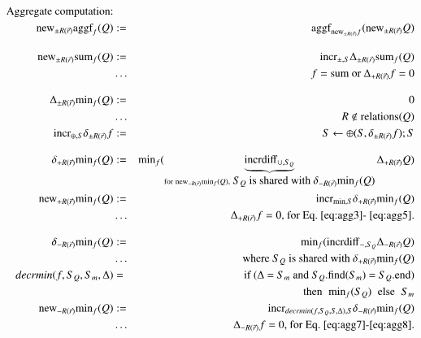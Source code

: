 \documentclass{article}
\begin{document}
%
%
%
\begin{figure*}
\begin{eqnarray}
\mbox{Aggregate computation:} && \nonumber
\\
\label{eq:agg1}
\algnew_{\pm R(\vec{r})} \algaggf_f(Q) &:=&
   \algaggf_{\algnew_{\pm R(\vec{r})} f}(\algnew_{\pm R(\vec{r})} Q)
%
%
\\[2ex]
\label{eq:agg2}
\algnew_{\pm R(\vec{r})} \algsum_{f}(Q) &:=&
\algincr_{\pm, S} \Delta_{\pm R(\vec{r})} \algsum_{f}(Q)
\\
\nonumber &\dots&
\mbox{$f = \algsum$ or $\Delta_{+R(\vec{r})} f = 0$}
%
%
\\[2ex]
\label{eq:agg3}
\Delta_{\pm R(\vec{r})} \algmin_f(Q) &:=& 0
\\
\nonumber &\dots& R \notin \mbox{relations($Q$)}
%
%
\\
\label{eq:agg4}
\algincr_{\oplus, S} \delta_{\pm R(\vec{r})} f &:=&
S \leftarrow \oplus(S, \delta_{\pm R(\vec{r})} f); S
%
%
\\[2ex]
\label{eq:agg5}
\delta_{+R(\vec{r})} \algmin_f(Q) &:=& \algmin_{f} (
    \underbrace{\algincrdiff_{\cup, S_Q}}_{
        \mathrm{for} \; \algnew_{-R(\vec{r})} \algmin_f(Q),
        \mbox{ $S_Q$ is shared with $\delta_{-R(\vec{r})} \algmin_f(Q)$}}
    \Delta_{+R(\vec{r})} Q)
\\
\label{eq:agg6}
\algnew_{+R(\vec{r})} \algmin_{f}(Q) &:=&
\algincr_{\min,S} \delta_{+R(\vec{r})} \algmin_{f}(Q)
\\
\nonumber
&\dots& \Delta_{+R(\vec{r})} f = 0
\mbox{, for Eq.~\ref{eq:agg3}-~\ref{eq:agg5}.}
%
%
\\[2ex]
\label{eq:agg7}
\delta_{-R(\vec{r})} \algmin_{f}(Q) &:=& \algmin_{f}(\algincrdiff_{-,S_Q} \Delta_{-R(\vec{r})} Q)
\\
\nonumber &\dots& \mbox{where $S_Q$ is shared with $\delta_{+R(\vec{r})} \algmin_f(Q)$}
\\
\label{eq:agg8}
decrmin(f, S_Q, S_m, \Delta) &=&
\mbox{if ($\Delta$ = $S_m$ and $S_Q$.find($S_m$) = $S_Q$.end)}\\
\nonumber && \mbox{then} \; \; \algmin_{f}(S_Q) \; \; \mbox{else} \; \; S_m
\\
\label{eq:agg9}
\algnew_{-R(\vec{r})} \algmin_{f}(Q) &:=&
\algincr_{decrmin(f, S_Q, S, \Delta), S} \delta_{-R(\vec{r})} \algmin_{f}(Q)
\\
\nonumber &\dots& \Delta_{-R(\vec{r})} f = 0
\mbox{, for Eq.~\ref{eq:agg7}-\ref{eq:agg8}.}
\end{eqnarray}
\end{figure*}
\end{document}
